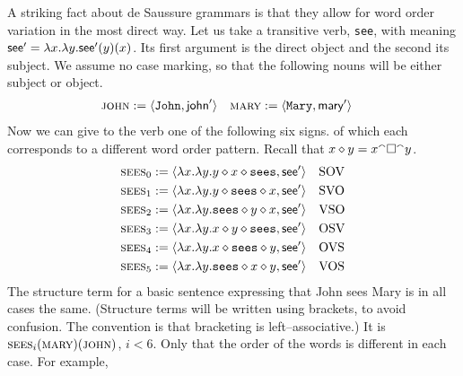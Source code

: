 A striking fact about de Saussure grammars is that they allow
for word order variation in the most direct way. Let us take a
transitive verb, {\tt see}, with meaning 
$\mbox{\sf see}' = \lambda x. \lambda y.
\mbox{\sf see}'(y)(x)$. Its first argument is the direct object
and the second its subject. We assume no case marking, so that
the following nouns will be either subject or object.
\begin{align}
\mbox{\sc john} & := \langle \mbox{\tt John}, \mbox{\sf john}'\rangle &
\mbox{\sc mary} & := \langle \mbox{\tt Mary}, \mbox{\sf mary}'\rangle 
\end{align}
Now we can give to the verb one of the following six signs.
of which each corresponds to a different word order pattern.
Recall that $x \diamond y = x {^{\smallfrown}} \square {^{\smallfrown}} y$.
\begin{align}
\mbox{\sc sees}_0 & := \langle \lambda x.\lambda y.
    y \diamond x \diamond \mbox{\tt sees}, \mbox{\sf see}'\rangle
        && \mbox{\rm SOV} \\
\mbox{\sc sees}_1 & := \langle \lambda x.\lambda y.
    y \diamond \mbox{\tt sees} \diamond x, \mbox{\sf see}'\rangle
        && \mbox{\rm SVO} \\
\mbox{\sc sees}_2 & := \langle \lambda x.\lambda y.
    \mbox{\tt sees} \diamond y \diamond x, \mbox{\sf see}'\rangle
        && \mbox{\rm VSO} \\
\mbox{\sc sees}_3 & := \langle \lambda x.\lambda y.
    x \diamond y \diamond \mbox{\tt sees}, \mbox{\sf see}'\rangle
        && \mbox{\rm OSV} \\
\mbox{\sc sees}_4 & := \langle \lambda x.\lambda y.
    x \diamond \mbox{\tt sees} \diamond y, \mbox{\sf see}'\rangle
        && \mbox{\rm OVS} \\
\mbox{\sc sees}_5 & := \langle \lambda x.\lambda y.
    \mbox{\tt sees}\diamond x \diamond y, \mbox{\sf see}'\rangle
        && \mbox{\rm VOS}
\end{align}
The structure term for a basic sentence expressing that John sees
Mary is in all cases the same. (Structure terms will be written 
using brackets, to avoid confusion. The convention is that bracketing 
is left--associative.) It is $\mbox{\sc sees}_i(\mbox{\sc mary})%
(\mbox{\sc john})$, $i < 6$. Only that the order of the words
is different in each case. For example,
